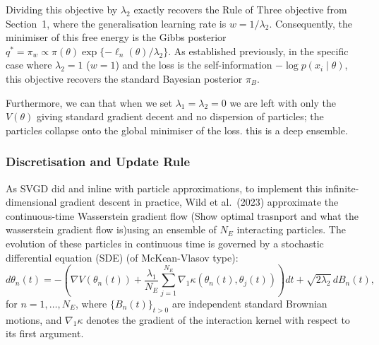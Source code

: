 \documentclass[11pt,a4paper]{article}
\newcommand{\add}[1]{{\color{red}#1}}
\begin{document}
Dividing this objective by $\lambda_2$ exactly recovers the Rule of Three objective from Section~1, where the generalisation learning rate is $w = 1/\lambda_2$. Consequently, the minimiser of this free energy is the Gibbs posterior $q^{*} = \pi_w \propto \pi(\theta)\exp\{-\ell_n(\theta)/\lambda_2\}$. As established previously, in the specific case where $\lambda_2=1$ ($w=1$) and the loss is the self-information $-\log p(x_i \mid \theta)$, this objective recovers the standard Bayesian posterior $\pi_B$.

Furthermore, we can that when we set $\lambda_1 = \lambda_2 = 0$ we are left with only the $V(\theta)$ giving standard gradient decent and no dispersion of particles; the particles collapse onto the global minimiser of the loss. \add{this is a deep ensemble.}



\subsubsection*{Discretisation and Update Rule}

As SVGD did and inline with particle approximations, to implement this infinite-dimensional gradient descent in practice, Wild et al.~(2023) approximate the continuous-time Wasserstein gradient flow (\add{Show optimal trasnport and what the wasserstein gradient flow is})using an ensemble of $N_E$ interacting particles. The evolution of these particles in continuous time is governed by a stochastic differential equation (SDE) (\add{of McKean-Vlasov type}):
\begin{equation}
    d\theta_n(t) = -\left( \nabla V(\theta_n(t)) + \frac{\lambda_1}{N_E} \sum_{j=1}^{N_E} \nabla_1 \kappa(\theta_n(t), \theta_j(t)) \right) dt + \sqrt{2\lambda_2} \, dB_n(t),
\end{equation}
for $n = 1, \dots, N_E$, where $\{B_n(t)\}_{t>0}$ are independent standard Brownian motions, and $\nabla_1 \kappa$ denotes the gradient of the interaction kernel with respect to its first argument.
\end{document}
